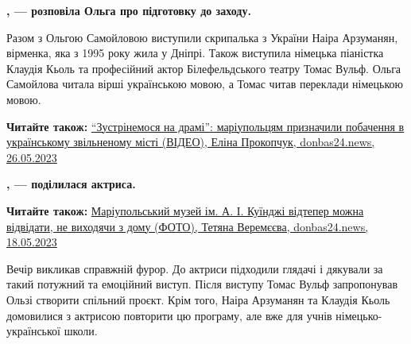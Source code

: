 
\begin{leftbar}
	\begingroup
		\bfseries
{}, — розповіла
Ольга про підготовку до заходу.
	\endgroup
\end{leftbar}

Разом з Ольгою Самойловою виступили скрипалька з України Наіра Арзуманян,
вірменка, яка з 1995 року жила у Дніпрі. Також виступила німецька піаністка
Клаудія Кьоль та професійний актор Білефельдського театру Томас Вульф. Ольга
Самойлова читала вірші українською мовою, а Томас читав переклади німецькою
мовою.

\textbf{Читайте також:} \href{https://donbas24.news/news/zustrinemosya-na-drami-mariupolciv-rozculilo-proniklive-video-pro-ridne-misto-video}{%
\enquote{Зустрінемося на драмі}: маріупольцям призначили побачення в українському звільненому місті (ВІДЕО), %
Еліна Прокопчук, donbas24.news, 26.05.2023%
}


\begin{leftbar}
	\begingroup
		\bfseries
{}, — поділилася актриса. 
	\endgroup
\end{leftbar}

\textbf{Читайте також:} \href{https://archive.org/details/18_05_2023.veremeeva_tetjana.donbas24.kuindzhi_muzej_ne_vyhodjachy_z_domu}{%
Маріупольський музей ім. А. І. Куїнджі відтепер можна відвідати, не виходячи з дому (ФОТО), %
Тетяна Веремєєва, donbas24.news, 18.05.2023%
}

Вечір викликав справжній фурор. До актриси підходили глядачі і дякували за
такий потужний та емоційний виступ. Після виступу Томас Вульф запропонував
Ользі створити спільний проєкт. Крім того, Наіра Арзуманян та Клаудія Кьоль
домовилися з актрисою повторити цю програму, але вже для учнів
німецько-української школи.

